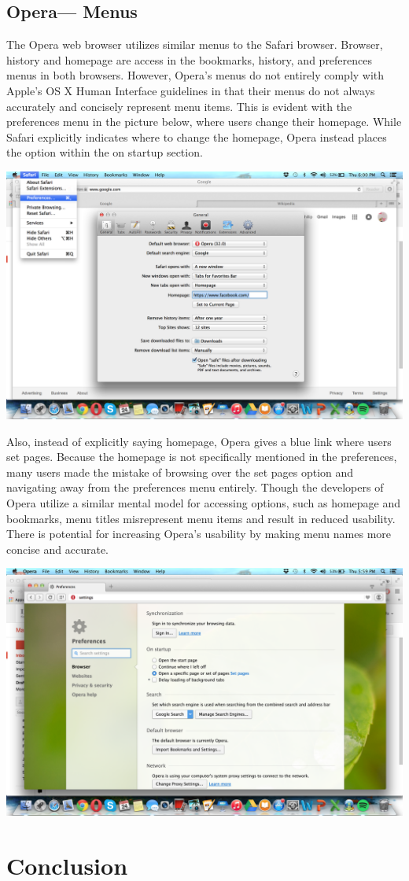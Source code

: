\documentclass{article}
\begin{document}
\subsection{Opera--- Menus} The Opera web browser utilizes similar menus to the Safari browser. Browser, history and homepage are access in the bookmarks, history, and preferences menus in both browsers. However, Opera's menus do not entirely comply with Apple's OS X Human Interface guidelines in that their menus do not always accurately and concisely represent menu items. This is evident with the preferences menu in the picture below, where users change their homepage. While Safari explicitly indicates where to change the homepage, Opera instead places the option within the on startup section. 
\begin{center}
\includegraphics[width=1\textwidth]{Safari_Homepage.png}
\end{center}
Also, instead of explicitly saying homepage, Opera gives a blue link where users set pages. Because the homepage is not specifically mentioned in the preferences, many users made the mistake of browsing over the set pages option and navigating away from the preferences menu entirely. Though the developers of Opera utilize a similar mental model for accessing options, such as homepage and bookmarks, menu titles misrepresent menu items and result in reduced usability. There is potential for increasing Opera's usability by making menu names more concise and accurate.
\begin{center}
\includegraphics[width=1\textwidth]{Opera_Homepage.png}
\end{center}

\section{Conclusion}
\end{document}
